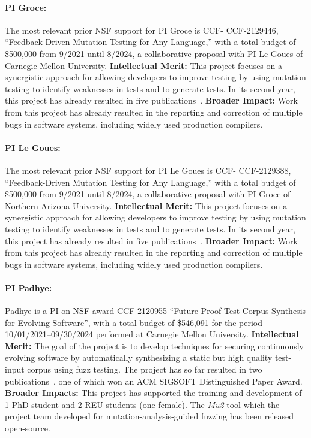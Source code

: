 \paragraph{PI Groce:}
The most relevant prior NSF support for PI Groce is CCF-
CCF-2129446, ``Feedback-Driven Mutation Testing for Any Language,'' with a 
total budget of \$500,000 from 9/2021 until 8/2024,
a collaborative proposal with PI Le Goues of Carnegie Mellon
University. {\bf Intellectual Merit:} This project
focuses on a synergistic approach for allowing developers
to improve testing by using mutation testing to identify
weaknesses in tests and to generate tests.  In its second
year,  this project has already resulted in five
publications~. {\bf
  Broader
  Impact:}  Work from this project has already
resulted in the reporting and correction of multiple bugs in software
systems, including widely used production compilers.

\paragraph{PI Le Goues:}
The most relevant prior NSF support for PI Le Goues is CCF-
CCF-2129388, ``Feedback-Driven Mutation Testing for Any Language,'' with a 
total budget of \$500,000 from 9/2021 until 8/2024,
a collaborative proposal with PI Groce of Northern Arizona University. {\bf Intellectual Merit:} This project
focuses on a synergistic approach for allowing developers
to improve testing by using mutation testing to identify
weaknesses in tests and to generate tests.  In its second
year,  this project has already resulted in five
publications~. {\bf
  Broader
  Impact:}  Work from this project has already
resulted in the reporting and correction of multiple bugs in software
systems, including widely used production compilers.

\paragraph{PI Padhye:}

Padhye is a PI on NSF award CCF-2120955 ``Future-Proof Test Corpus Synthesis for Evolving Software'',
with a total budget of 	\$546,091 for the period 10/01/2021--09/30/2024 performed 
at Carnegie Mellon University. 
{\bf Intellectual Merit:} The goal of the project is to develop techniques for securing continuously evolving software 
by automatically synthesizing a static but high quality test-input corpus using 
fuzz testing. The project has so far resulted in two publications~\cite{naturalfuzz, mu2}, one
of which won an ACM SIGSOFT Distinguished Paper Award. {\bf Broader Impacts:} 
This project has supported the training and development of 1 PhD student and 
2 REU students (one female). The \emph{Mu2} tool which the project team developed
for mutation-analysis-guided fuzzing has been released open-source. 

